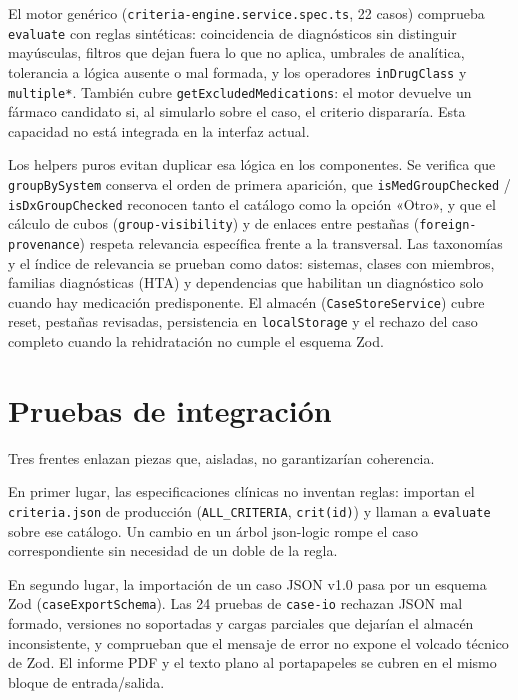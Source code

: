El motor genérico (\texttt{criteria-engine.service.spec.ts}, 22 casos)
comprueba \texttt{evaluate} con reglas sintéticas: coincidencia de
diagnósticos sin distinguir mayúsculas, filtros que dejan fuera lo que no
aplica, umbrales de analítica, tolerancia a lógica ausente o mal formada, y
los operadores \texttt{inDrugClass} y \texttt{multiple*}. También cubre
\texttt{getExcludedMedications}: el motor devuelve un fármaco candidato si,
al simularlo sobre el caso, el criterio dispararía. Esta capacidad no está
integrada en la interfaz actual.

Los helpers puros evitan duplicar esa lógica en los componentes. Se
verifica que \texttt{groupBySystem} conserva el orden de primera aparición,
que \texttt{isMedGroupChecked} / \texttt{isDxGroupChecked} reconocen tanto
el catálogo como la opción «Otro», y que el cálculo de cubos
(\texttt{group-visibility}) y de enlaces entre pestañas
(\texttt{foreign-provenance}) respeta relevancia específica frente a la
transversal. Las taxonomías y el índice de relevancia se prueban como
datos: sistemas, clases con miembros, familias diagnósticas (HTA) y
dependencias que habilitan un diagnóstico solo cuando hay medicación
predisponente. El almacén (\texttt{CaseStoreService}) cubre reset,
pestañas revisadas, persistencia en \texttt{localStorage} y el rechazo
del caso completo cuando la rehidratación no cumple el esquema Zod.

\section{Pruebas de integración}

Tres frentes enlazan piezas que, aisladas, no garantizarían coherencia.

En primer lugar, las especificaciones clínicas no inventan reglas: importan
el \texttt{criteria.json} de producción (\texttt{ALL\_CRITERIA},
\texttt{crit(id)}) y llaman a \texttt{evaluate} sobre ese catálogo. Un
cambio en un árbol json-logic rompe el caso correspondiente sin necesidad
de un doble de la regla.

En segundo lugar, la importación de un caso JSON v1.0 pasa por un esquema
Zod (\texttt{caseExportSchema}). Las 24 pruebas de \texttt{case-io} rechazan
JSON mal formado, versiones no soportadas y cargas parciales que dejarían
el almacén inconsistente, y comprueban que el mensaje de error no expone
el volcado técnico de Zod. El informe PDF y el texto plano al portapapeles
se cubren en el mismo bloque de entrada/salida.

